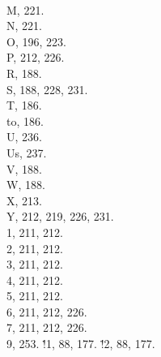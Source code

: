 \:\.{\\M}, 221.
\:\.{\\N}, 221.
\:\.{\\O}, 196, 223.
\:\.{\\P}, 212, 226.
\:\.{\\R}, 188.
\:\.{\\S}, 188, 228, 231.
\:\.{\\T}, 186.
\:\.{\\to}, 186.
\:\.{\\U}, 236.
\:\.{\\Us}, 237.
\:\.{\\V}, 188.
\:\.{\\W}, 188.
\:\.{\\X}, 213.
\:\.{\\Y}, 212, 219, 226, 231.
\:\.{\\1}, 211, 212.
\:\.{\\2}, 211, 212.
\:\.{\\3}, 211, 212.
\:\.{\\4}, 211, 212.
\:\.{\\5}, 211, 212.
\:\.{\\6}, 211, 212, 226.
\:\.{\\7}, 211, 212, 226.
\:\.{\\9}, 253.
\:\.{\AT!1}, 88, 177.
\:\.{\AT!2}, 88, 177.
